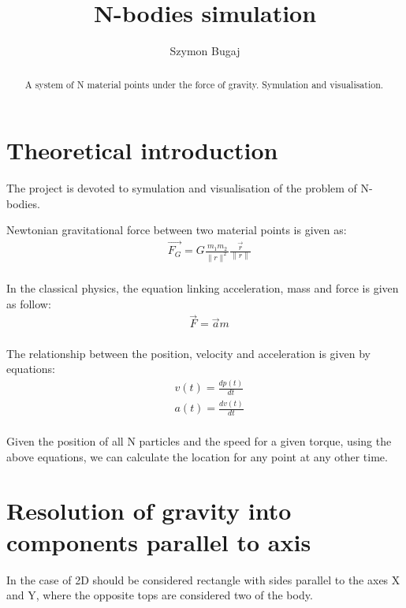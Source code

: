 \documentclass[fleqn]{article}
\begin{document}
\title{N-bodies simulation}
\author{Szymon Bugaj}

\maketitle

\begin{abstract}
A system of N material points under the force of gravity. Symulation and visualisation.
\end{abstract}

\tableofcontents



\section{Theoretical introduction}
The project is devoted to symulation and visualisation of the problem of N-bodies. 

Newtonian gravitational force between two material points is given as:
\begin{align*}
    &\vec{F_{G}} = G\frac{m_{1} m_{2}}{\|r\|^{2}}\frac{\vec{r}}{\|r\|} \\
\end{align*}

In the classical physics, the equation linking acceleration, mass and force is given as follow:
\begin{align*}
    &\vec{F} = \vec{a}m \\
\end{align*}

The relationship between the position, velocity and acceleration is given by equations:
\begin{align*}
    &v(t) = \frac{dp(t)}{dt} \\
    &a(t) = \frac{dv(t)}{dt} \\
\end{align*}

Given the position of all N particles and the speed for a given torque, using the above equations, we can calculate the location for any point at any other time.

\section{Resolution of gravity into components parallel to axis}
In the case of 2D should be considered rectangle with sides parallel to the axes X and Y, where the opposite tops are considered two of the body.
\end{document}
